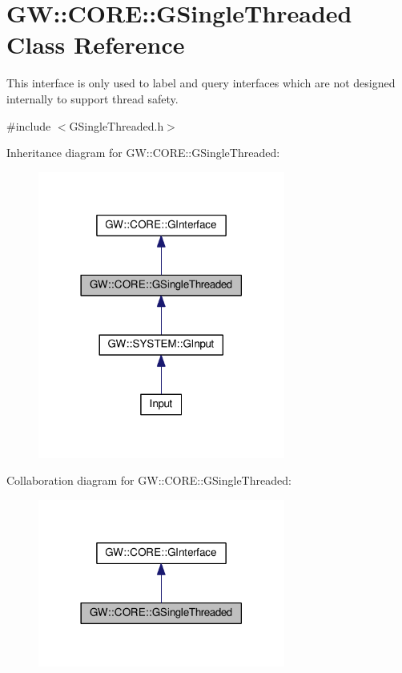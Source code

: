 \hypertarget{classGW_1_1CORE_1_1GSingleThreaded}{}\section{GW\+:\+:C\+O\+RE\+:\+:G\+Single\+Threaded Class Reference}
\label{classGW_1_1CORE_1_1GSingleThreaded}


This interface is only used to label and query interfaces which are not designed internally to support thread safety.  




{\ttfamily \#include $<$G\+Single\+Threaded.\+h$>$}



Inheritance diagram for GW\+:\+:C\+O\+RE\+:\+:G\+Single\+Threaded\+:
\nopagebreak
\begin{figure}[H]
\begin{center}
\leavevmode
\includegraphics[width=230pt]{classGW_1_1CORE_1_1GSingleThreaded__inherit__graph}
\end{center}
\end{figure}


Collaboration diagram for GW\+:\+:C\+O\+RE\+:\+:G\+Single\+Threaded\+:
\nopagebreak
\begin{figure}[H]
\begin{center}
\leavevmode
\includegraphics[width=230pt]{classGW_1_1CORE_1_1GSingleThreaded__coll__graph}
\end{center}
\end{figure}
